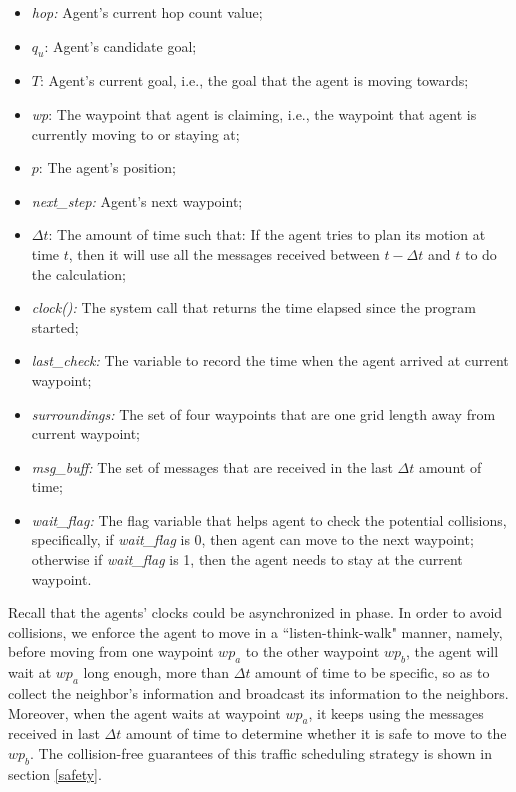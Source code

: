 \documentclass[journal]{IEEEtran}
\begin{document}
\begin{itemize}
    \item \textit{hop:} Agent's current hop count value;
    
    \item $q_u$: Agent's candidate goal;
    \item $T$: Agent's current goal, i.e., the goal that the agent is moving towards;
    \item \textit{wp}: The waypoint that agent is claiming, i.e., the waypoint that agent is currently moving to or staying at;
    \item $p$: The agent's position;
    \item \textit{next\_step: } Agent's next waypoint;
    \item $\Delta t$: The amount of time such that: If the agent tries to plan its motion at time $t$, then it will use all the messages received between $t-\Delta t$ and $t$ to do the calculation; 
    \item \textit{clock(): }The system call that returns the time elapsed since the program started;
     \item \textit{last\_check: }The variable to record the time when the agent arrived at current waypoint;
    \item \textit{surroundings: }The set of four waypoints that are one grid length away from current waypoint;
    \item \textit{msg\_buff: }The set of messages that are received in the last $\Delta t$ amount of time;
    \item \textit{wait\_flag: }The flag variable that helps agent to check the potential collisions, specifically, if \textit{wait\_flag} is 0, then agent can move to the next waypoint; otherwise if \textit{wait\_flag} is 1, then the agent needs to stay at the current waypoint.  
\end{itemize}

Recall that the agents' clocks could be asynchronized in phase. In order to avoid collisions, we enforce the agent to move in a ``listen-think-walk" manner, namely, before moving from one waypoint $wp_a$ to the other waypoint $wp_b$, the agent will wait at $wp_a$ long enough, more than $\Delta t$ amount of time to be specific, so as to collect the neighbor's information and broadcast its information to the neighbors. Moreover, when the agent waits at waypoint $wp_a$, it keeps using the messages received in last $\Delta t$ amount of time to determine whether it is safe to move to the $wp_b$. The collision-free guarantees of this traffic scheduling strategy is shown in section \ref{safety}. 
\end{document}
